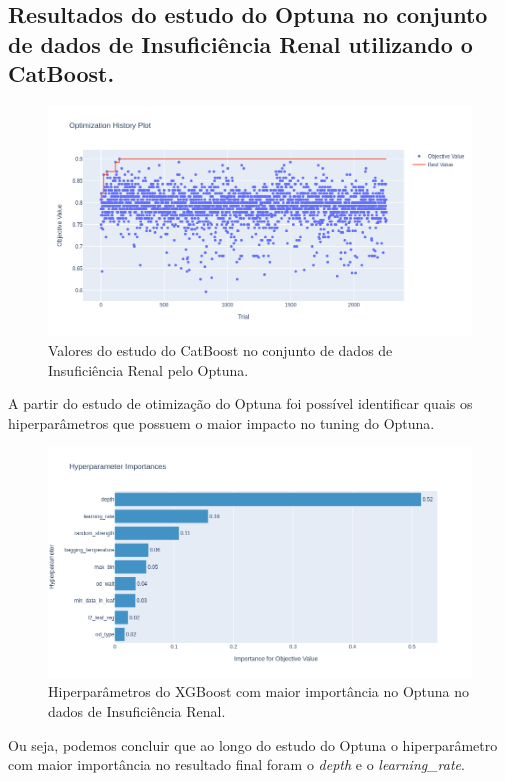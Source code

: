\subsection{Resultados do estudo do Optuna no conjunto de dados de Insuficiência Renal utilizando o CatBoost.}
\begin{figure}[H]
 \caption{Valores do estudo do CatBoost no conjunto de dados de Insuficiência Renal pelo Optuna.}
 \label{fig:op:kind:trials:cat}
 \centering
 \includegraphics[scale=0.4]{images/optuna_catboost_kidney.png}
\end{figure}
A partir do estudo de otimização do Optuna foi possível identificar quais os hiperparâmetros que possuem o maior impacto no tuning do Optuna.
\begin{figure}[H]
 \caption{Hiperparâmetros do XGBoost com maior importância no Optuna no dados de Insuficiência Renal.}
 \label{fig:op:kind:impo:cat}
 \centering
 \includegraphics[scale=0.4]{images/optuna_catboost_importance_kidney.png}
\end{figure}
Ou seja, podemos concluir que ao longo do estudo do Optuna o hiperparâmetro com maior importância no resultado final foram o \textit{depth} e o \textit{learning\_rate}.

